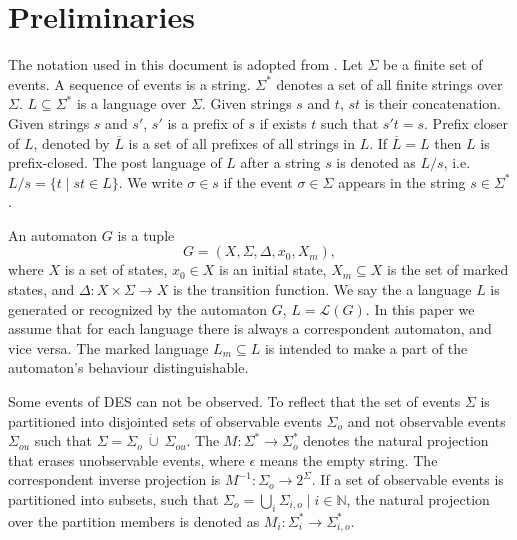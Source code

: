 \documentclass[a4paper, 10pt, conference]{ieeeconf}
\begin{document}


\section{Preliminaries}
\label{sec:Preliminaries}
The notation used in this document is adopted from
\cite{cassandras_introduction_2010}.
Let $\Sigma$ be a finite set of events. A sequence of events is a string.
$\Sigma^*$ denotes a set of all finite strings over $\Sigma$.
$L\subseteq\Sigma^*$ is a language over $\Sigma$. Given strings $s$ and $t$,
$st$ is their concatenation. Given strings $s$ and $s'$, $s'$ is a prefix of $s$
if exists $t$ such that $s't = s$. Prefix closer of $L$, denoted by
$\overline{L}$ is a set of all prefixes of all strings in $L$.
If $\overline{L} = L$ then $L$ is prefix-closed. The post language of $L$ after
a string $s$ is denoted as $L/s$, i.e. $L/s = \{t\mid st \in L\}$. We write
$\sigma \in s$ if the event $\sigma \in \Sigma$ appears in the string $s \in
\Sigma^*$.

An automaton $G$ is a tuple $$G=(X,\Sigma,\Delta,x_0, X_m),$$ where $X$ is a
set of states, $x_0 \in X$ is an initial state, $X_m \subseteq X$ is the set of
marked states, and $\Delta: X \times \Sigma \rightarrow X$ is the transition
function.
We say the a language $L$ is generated or recognized by the automaton $G$, $L =
\mathcal{L}(G)$. In this paper we assume that for each language there is always
a correspondent automaton, and vice versa. The marked language $L_m \subseteq
L$ is intended to make a part of the automaton's behaviour distinguishable.

Some events of DES can not be observed. To reflect that the set of events
$\Sigma$ is partitioned into disjointed sets of observable events $\Sigma_o$ and
not observable events $\Sigma_{ou}$ such that $\Sigma = \Sigma_o~\dot{\cup}~
\Sigma_{ou}$.
The $M: \Sigma^* \rightarrow \Sigma_o^*$ denotes the natural projection that
erases unobservable events, where $\epsilon$ means the empty string. The
correspondent inverse projection is $M^{-1}: \Sigma_o \rightarrow 2^\Sigma$. If
a set of observable events is partitioned into subsets, such that $\Sigma_o =
\bigcup_i \Sigma_{i,o} \mid i \in \mathbb{N}$, the natural projection over the
partition members is denoted as $M_i: \Sigma_i^* \rightarrow \Sigma_{i,o}^*$.
\end{document}
